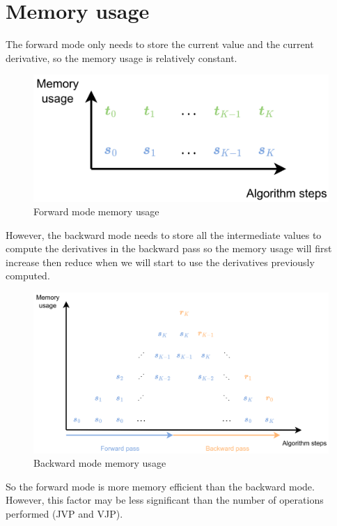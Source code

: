\documentclass[12pt, openany]{report}
\theoremstyle{definition}
\begin{document}
\section{Memory usage}
The forward mode only needs to store the current value and the current derivative, so the memory usage is relatively constant.\\
\begin{figure}[H]
    \centering
    \includegraphics[width=\textwidth]{img/fd_mem.png}
    \caption{Forward mode memory usage}
    \label{fig:fd_mem}
\end{figure}
However, the backward mode needs to store all the intermediate values to compute the derivatives in the backward pass so the memory usage will first increase then reduce when we will start to use the derivatives previously computed.\\
\begin{figure}[H]
    \centering
    \includegraphics[width=\textwidth]{img/bd_mem.png}
    \caption{Backward mode memory usage}
    \label{fig:bd_mem}
\end{figure}
So the forward mode is more memory efficient than the backward mode. However, this factor may be less significant than the number of operations performed (JVP and VJP).
\end{document}
